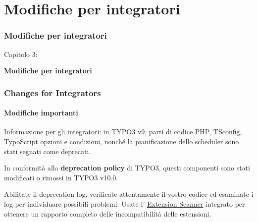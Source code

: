 %

\section{Modifiche per integratori}
\begin{frame}[fragile]
	\frametitle{Modifiche per integratori}

	\begin{center}\huge{Capitolo 3:}\end{center}
	\begin{center}\huge{\color{typo3darkgrey}\textbf{Modifiche per integratori}}\end{center}

\end{frame}


\begin{frame}[fragile]
	\frametitle{Changes for Integrators}
	\framesubtitle{Modifiche importanti}

	\small
		Informazione per gli integratori: in TYPO3 v9, parti di codice PHP, TSconfig, TypoScript
		opzioni e condizioni, nonché la pianificazione dello scheduler sono stati segnati come deprecati.

		\vspace{0.2cm}

		In conformità alla \textbf{deprecation policy} di TYPO3, questi componenti sono stati
		modificati o rimossi in TYPO3 v10.0.

		\vspace{0.2cm}

		Abilitate il deprecation log, verificate attentamente il vostro codice ed esaminate i log per
		individuare possibili problemi. Usate l'
		\href{https://docs.typo3.org/m/typo3/reference-coreapi/master/en-us/ApiOverview/ExtensionScanner/Index.html}{Extension Scanner}
		integrato per ottenere un rapporto completo delle incompatibilità delle estensioni.

	\normalsize

\end{frame}

